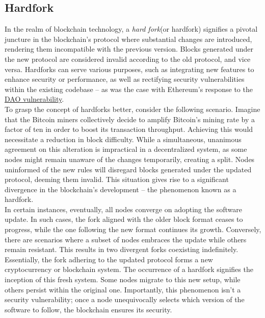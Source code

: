 \documentclass{report}
\begin{document}
\subsection{Hardfork}
In the realm of blockchain technology, a \textit{hard fork}(or hardfork) signifies a pivotal juncture in the blockchain's protocol where substantial changes are introduced, rendering them incompatible with the previous version. Blocks generated under the new protocol are considered invalid according to the old protocol, and vice versa. Hardforks can serve various purposes, such as integrating new features to enhance security or performance, as well as rectifying security vulnerabilities within the existing codebase – as was the case with Ethereum's response to the \href{https://en.wikipedia.org/wiki/The_DAO_(organization)}{DAO vulnerability}.\\
To grasp the concept of hardforks better, consider the following scenario. Imagine that the Bitcoin miners collectively decide to amplify Bitcoin's mining rate by a factor of ten in order to boost its transaction throughput. Achieving this would necessitate a reduction in block difficulty. While a simultaneous, unanimous agreement on this alteration is impractical in a decentralized system, as some nodes might remain unaware of the changes temporarily, creating a split. Nodes uninformed of the new rules will disregard blocks generated under the updated protocol, deeming them invalid. This situation gives rise to a significant divergence in the blockchain's development – the phenomenon known as a hardfork.\\
In certain instances, eventually, all nodes converge on adopting the software update. In such cases, the fork aligned with the older block format ceases to progress, while the one following the new format continues its growth. Conversely, there are scenarios where a subset of nodes embraces the update while others remain resistant. This results in two divergent forks coexisting indefinitely. Essentially, the fork adhering to the updated protocol forms a new cryptocurrency or blockchain system. The occurrence of a hardfork signifies the inception of this fresh system. Some nodes migrate to this new setup, while others persist within the original one. Importantly, this phenomenon isn't a security vulnerability; once a node unequivocally selects which version of the software to follow, the blockchain ensures its security.\\
\end{document}
